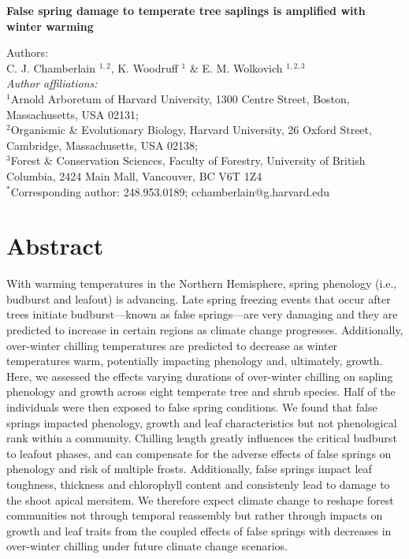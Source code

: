 \documentclass{article}\usepackage[]{graphicx}\usepackage[]{color}
\begin{document}
\noindent \textbf{\Large{False spring damage to temperate tree saplings is amplified with winter warming}}

\noindent Authors:\\
C. J. Chamberlain $^{1,2}$, K. Woodruff $^{1}$ \& E. M. Wolkovich $^{1,2,3}$
\vspace{2ex}\\
\emph{Author affiliations:}\\
$^{1}$Arnold Arboretum of Harvard University, 1300 Centre Street, Boston, Massachusetts, USA 02131; \\
$^{2}$Organismic \& Evolutionary Biology, Harvard University, 26 Oxford Street, Cambridge, Massachusetts, USA 02138; \\
$^{3}$Forest \& Conservation Sciences, Faculty of Forestry, University of British Columbia, 2424 Main Mall, Vancouver, BC V6T 1Z4\\
\vspace{2ex}
$^*$Corresponding author: 248.953.0189; cchamberlain@g.harvard.edu\\

\renewcommand{\thetable}{\arabic{table}}
\renewcommand{\thefigure}{\arabic{figure}}
\renewcommand{\labelitemi}{$-$}


\section*{Abstract} %
With warming temperatures in the Northern Hemisphere, spring phenology (i.e., budburst and leafout) is advancing. Late spring freezing events that occur after trees initiate budburst---known as false springs---are very damaging and they are predicted to increase in certain regions as climate change progresses. Additionally, over-winter chilling temperatures are predicted to decrease as winter temperatures warm, potentially impacting phenology and, ultimately, growth. Here, we assessed the effects varying durations of over-winter chilling on sapling phenology and growth across eight temperate tree and shrub species. Half of the individuals were then exposed to false spring conditions. We found that false springs impacted phenology, growth and leaf characteristics but not phenological rank within a community. Chilling length greatly influences the critical budburst to leafout phases, and can compensate for the adverse effects of false springs on phenology and risk of multiple frosts. Additionally, false springs impact leaf toughness, thickness and chlorophyll content and consistenly lead to damage to the shoot apical mersitem. We therefore expect climate change to reshape forest communities not through temporal reassembly but rather through impacts on growth and leaf traits from the coupled effects of false springs with decreases in over-winter chilling under future climate change scenarios.
\end{document}
